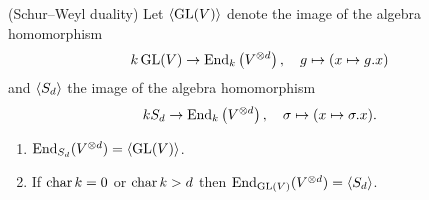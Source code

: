 \begin{thrm}(Schur--Weyl duality)
  Let $\left\langle \operatorname{GL}(V) \right\rangle$ denote the image of the algebra homomorphism
  \[
            k \operatorname{GL}(V)
    \to     \operatorname{End}_k\left( V^{\otimes d} \right),
    \quad   g
    \mapsto (x \mapsto g.x)
  \]
  and $\left\langle S_d \right\rangle$ the image of the algebra homomorphism
  \[
            k S_d
    \to     \operatorname{End}_k\left( V^{\otimes d} \right),
    \quad   \sigma
    \mapsto (x \mapsto \sigma.x).
  \]
  \begin{enumerate}[label=\emph{(\alph*)}, leftmargin=*]
    \item \label{enum: end sd = gl}
      $\operatorname{End}_{S_d}(V^{\otimes d}) = \left\langle \operatorname{GL}(V) \right\rangle$.
    \item \label{enum: end gl = sd}
      If $\operatorname{char} k = 0$ or $\operatorname{char} k > d$ then $\operatorname{End}_{\operatorname{GL}(V)}(V^{\otimes d}) = \left\langle S_d \right\rangle$.
  \end{enumerate}
\end{thrm}
